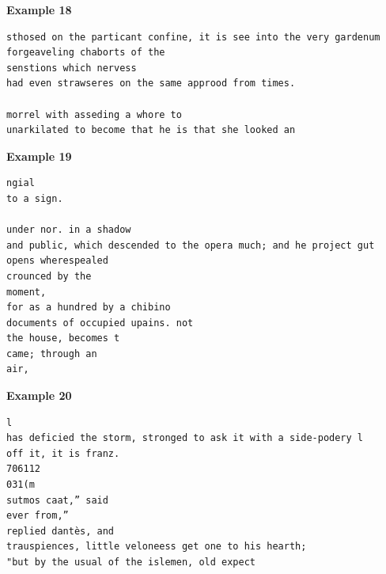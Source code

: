 \documentclass[12pt]{article}
\begin{document}
\textbf{Example 18}
\begin{verbatim}
sthosed on the particant confine, it is see into the very gardenum 
forgeaveling chaborts of the
senstions which nervess
had even strawseres on the same approod from times.

morrel with asseding a whore to
unarkilated to become that he is that she looked an
\end{verbatim}

\textbf{Example 19}
\begin{verbatim}
ngial
to a sign.

under nor. in a shadow
and public, which descended to the opera much; and he project gut
opens wherespealed
crounced by the
moment,
for as a hundred by a chibino
documents of occupied upains. not
the house, becomes t
came; through an
air,
\end{verbatim}

\textbf{Example 20}
\begin{verbatim}
l
has deficied the storm, stronged to ask it with a side-podery l
off it, it is franz. 
706112
031(m
sutmos caat,” said
ever from,”
replied dantès, and
trauspiences, little veloneess get one to his hearth;
"but by the usual of the islemen, old expect
\end{verbatim}




\end{document}
